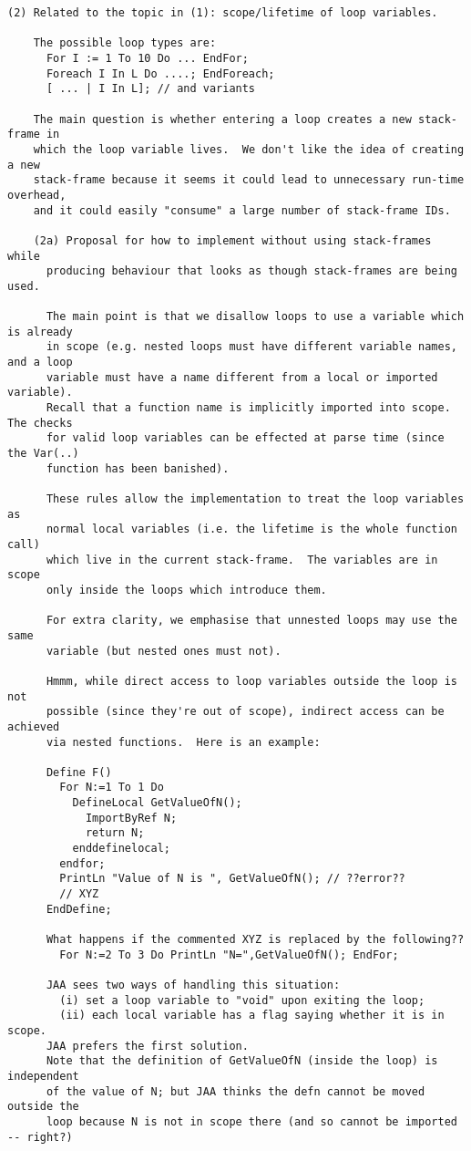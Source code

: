 \documentclass{book}[12,a4paper]
\begin{document}
\begin{verbatim}
(2) Related to the topic in (1): scope/lifetime of loop variables.

    The possible loop types are:
      For I := 1 To 10 Do ... EndFor;
      Foreach I In L Do ....; EndForeach;
      [ ... | I In L]; // and variants

    The main question is whether entering a loop creates a new stack-frame in
    which the loop variable lives.  We don't like the idea of creating a new
    stack-frame because it seems it could lead to unnecessary run-time overhead,
    and it could easily "consume" a large number of stack-frame IDs.

    (2a) Proposal for how to implement without using stack-frames while
      producing behaviour that looks as though stack-frames are being used.

      The main point is that we disallow loops to use a variable which is already
      in scope (e.g. nested loops must have different variable names, and a loop
      variable must have a name different from a local or imported variable).
      Recall that a function name is implicitly imported into scope.  The checks
      for valid loop variables can be effected at parse time (since the Var(..)
      function has been banished).

      These rules allow the implementation to treat the loop variables as
      normal local variables (i.e. the lifetime is the whole function call)
      which live in the current stack-frame.  The variables are in scope
      only inside the loops which introduce them.

      For extra clarity, we emphasise that unnested loops may use the same
      variable (but nested ones must not).

      Hmmm, while direct access to loop variables outside the loop is not
      possible (since they're out of scope), indirect access can be achieved
      via nested functions.  Here is an example:

      Define F()
        For N:=1 To 1 Do
          DefineLocal GetValueOfN();
            ImportByRef N;
            return N;
          enddefinelocal;
        endfor;
        PrintLn "Value of N is ", GetValueOfN(); // ??error??
        // XYZ
      EndDefine;

      What happens if the commented XYZ is replaced by the following??
        For N:=2 To 3 Do PrintLn "N=",GetValueOfN(); EndFor;

      JAA sees two ways of handling this situation:
        (i) set a loop variable to "void" upon exiting the loop;
        (ii) each local variable has a flag saying whether it is in scope.
      JAA prefers the first solution.
      Note that the definition of GetValueOfN (inside the loop) is independent
      of the value of N; but JAA thinks the defn cannot be moved outside the
      loop because N is not in scope there (and so cannot be imported -- right?)



\end{verbatim}
\end{document}
